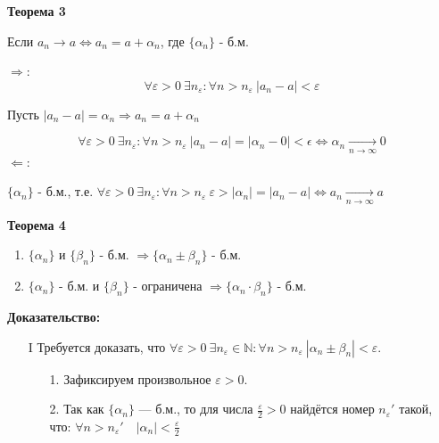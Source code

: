 \documentclass[12pt, a4paper]{article}
\newcommand{\eps}{\varepsilon}
\begin{document}
\begin{centering}
\begin{tcolorbox}
\textbf{Теорема 3} 
\begin{center}
    Если $a_n \rightarrow a \Leftrightarrow a_n = a + \alpha_n$, где $ \{\alpha_n\}$ - б.м.
\end{center}
\end{tcolorbox}

\begin{tcolorbox}[title=Доказательство Т3]
$\Rightarrow$:\\
\[ \forall \eps>0\ \exists n_\eps : \forall n > n_\eps\ |a_n - a| < \eps \]
\begin{center}
    Пусть $ |a_n-a| = \alpha_n \Rightarrow a_n = a + \alpha_n $    
\end{center}
\[ \forall \eps > 0\ \exists n_\eps: \forall n > n_\eps\  |a_n -a| = |\alpha_n - 0| < \epsilon \Leftrightarrow \alpha_n \xrightarrow[n\rightarrow \infty]{} 0 \]
$\Leftarrow$:\\
\begin{center}
    $ \{\alpha_n \} $ - б.м., т.е. $ \forall \eps>0\ \exists n_\eps : \forall n > n_\eps\ \eps > |\alpha_n| = |a_n-a| \Leftrightarrow a_n \xrightarrow[n \rightarrow \infty]{} a$    
\end{center}
\end{tcolorbox}

\begin{tcolorbox}
\textbf{Теорема 4}
\begin{enumerate}
    \item $\{\alpha_n\}$ и $\{\beta_n\}$ - б.м. $\Rightarrow \{\alpha_n \pm \beta_n\}$ - б.м.
    \item $\{\alpha_n\}$ - б.м. и $\{\beta_n\}$ - ограничена $\Rightarrow \{\alpha_n \cdot \beta_n\}$ - б.м.
\end{enumerate}
\end{tcolorbox}

\begin{tcolorbox}[title=Доказательство Т4: Предел суммы/разности б.м. последовательностей, breakable]
\small

\textbf{Доказательство:}
\begin{enumerate}

\item[I] Требуется доказать, что \( \forall \varepsilon > 0\ \exists n_\varepsilon \in \mathbb{N} : \forall n > n_\varepsilon\ |\alpha_n \pm \beta_n| < \varepsilon \).

\begin{enumerate}
    \item[1.] Зафиксируем произвольное \( \varepsilon > 0 \).
    \item[2.] Так как \( \{\alpha_n\} \) — б.м., то для числа \( \frac{\varepsilon}{2} > 0 \) найдётся номер \( n_{\varepsilon}' \) такой, что: $\forall n > n_{\varepsilon}'\quad |\alpha_n| < \frac{\varepsilon}{2}$
    

\end{enumerate}
\end{enumerate}
\end{tcolorbox}
\end{centering}
\end{document}
